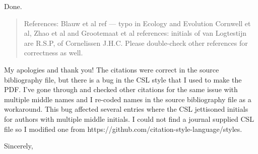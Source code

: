 \documentclass[letterpaper, 12pt]{letter}
\begin{document}
\begin{letter}{}
Done.

\begin{quote}
References: Blauw et al ref --- typo in Ecology and Evolution
Cornwell et al, Zhao et al and Grootemaat et al references: initials of van Logtestijn are R.S.P, of Cornelissen J.H.C. Please double-check other references for correctness as well.
\end{quote}

My apologies and thank you! The citations were correct in the source bibliography file, but there is a bug in the CSL style that I used to make the PDF. I've gone through and checked other citations for the same issue with multiple middle names and I re-coded names in the source bibliography file as a workaround. This bug affected several entries where the CSL jettisoned initials for authors with multiple middle initials. I could not find a journal supplied CSL file so I modified one from https://github.com/citation-style-language/styles.


\closing{Sincerely,}

\end{letter}
\end{document}
